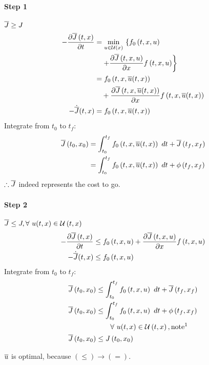 \paragraph{Step 1} $\Jbar{} \geq J$
\begin{align*}
- \pdein{\Jbar{t,x}}{t}
        &= \minux{} \left\lbrace f_0 \paren{\txu} \right. \\
        &\quad \left. + \pdein{\Jbar{\txu}}{x}f \paren{\txu} \right\rbrace \\
        &= f_0 \paren{\txuBar} \\
        &\quad + \pdein{\Jbar{\txuBar}}{x}f \paren{\txuBar} \\
-\dot{\Jbar{}}(t,x)
        &= f_0 \paren{\txuBar}\\
\end{align*}
Integrate from $t_0$ to $t_f$:
\begin{align*}
\Jbar{t_0,x_0}
        &= \intdt{t_0}{t_f}{f_0 \paren{\txuBar}} + \Jbar{t_f,x_f}\\
        &= \intdt{t_0}{t_f}{f_0 \paren{\txuBar}} + \phi \paren{t_f,x_f}
\end{align*}
$\therefore \Jbar{}$ indeed represents the cost to go.

\paragraph{Step 2} $\Jbar{} \leq J, \forall~u(t,x) \in \setU{t,x}$
\begin{align*}
    - \pdein{\Jbar{t,x}}{t}
        &\leq f_0 \paren{\txu} + \pdein{\Jbar{\txu}}{x} f \paren{\txu} \\
-\dot{\Jbar{}}(t,x)
        &\leq f_0 \paren{\txu}
\end{align*}%
%
Integrate from $t_0$ to $t_f$:
\begin{align*}
\Jbar{t_0,x_0}
        &\leq \intdt{t_0}{t_f}{f_0 \paren{\txu}} + \Jbar{t_f,x_f}\\
\Jbar{t_0,x_0}
        &\leq \intdt{t_0}{t_f}{f_0 \paren{\txu}} + \phi \paren{t_f,x_f}\\
        &\qquad \forall~u(t,x) \in \setU{t,x}, \txt{note\footnotemark}\\
\Jbar{t_0,x_0}
        &\leq J \paren{t_0,x_0}
\end{align*}

$\ubar{}$ is optimal, because $(\leq) \rightarrow (=)$.

